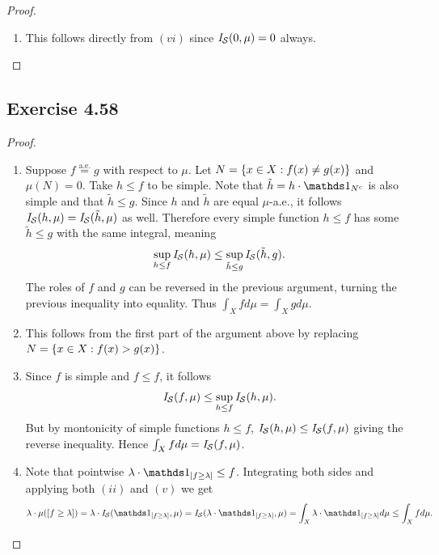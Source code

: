 \documentclass[hw_all.tex]{subfiles}
\begin{document}
\begin{proof}
\begin{enumerate}
        \item 
            This follows directly from $(vi)$ since $\mathit{I}_{\mathcal{S}}(0, \mu) = 0$ always.
    \end{enumerate}
\end{proof}

\subsection{Exercise 4.58}

\begin{proof}
    \begin{enumerate}
        \item[(i)]
            Suppose $f \overset{\text{a.e.}}{=} g$ with respect to $\mu$. Let $N = \qty{x \in X : f(x) \neq g(x)}$ and $\mu(N) = 0$. Take $h \leq f$ to be simple. Note that $\tilde{h} = h \cdot \ind{N^c}$ is also simple and that $\tilde{h} \leq g$. Since $h$ and $\tilde{h}$ are equal $\mu$-a.e., it follows $\mathit{I}_{\mathcal{S}}(h, \mu) = \mathit{I}_{\mathcal{S}}(\tilde{h}, \mu)$ as well. Therefore every simple function $h \leq f$ has some $\tilde{h} \leq g$ with the same integral, meaning
            \[
                \sup_{h \leq f} \mathit{I}_{\mathcal{S}}(h, \mu) \leq \sup_{\tilde{h} \leq g} \mathit{I}_{\mathcal{S}}(\tilde{h}, g)
            .\]
            The roles of $f$ and $g$ can be reversed in the previous argument, turning the previous inequality into equality. Thus $\int_X f d \mu = \int_X g d \mu$.

        \item[(ii)]
            This follows from the first part of the argument above by replacing $N = \qty{x \in X : f(x) > g(x)}$.

        \item[(v)]
            Since $f$ is simple and $f \leq f$, it follows
            \[
                \mathit{I}_{\mathcal{S}}(f, \mu) \leq \sup_{h \leq f} \mathit{I}_{\mathcal{S}}(h, \mu) 
            .\]
            But by montonicity of simple functions $h \leq f$, $\mathit{I}_{\mathcal{S}}(h, \mu) \leq \mathit{I}_{\mathcal{S}}(f, \mu)$ giving the reverse inequality. Hence $\int_X f d \mu = \mathit{I}_{\mathcal{S}}(f, \mu)$.

        \item[(vi)]
            Note that pointwise $\lambda \cdot \ind{[f \geq \lambda]} \leq f$. Integrating both sides and applying both $(ii)$ and $(v)$ we get
            \[
                \lambda\cdot \mu([f \geq \lambda]) = \lambda \cdot \sint(\ind{[f \geq \lambda]}, \mu) = \sint(\lambda \cdot \ind{[f \geq \lambda]}, \mu) = \int_X \lambda \cdot \ind{[f \geq \lambda]} d \mu \leq \int_X f d \mu
            .\]


\end{enumerate}
\end{proof}
\end{document}

